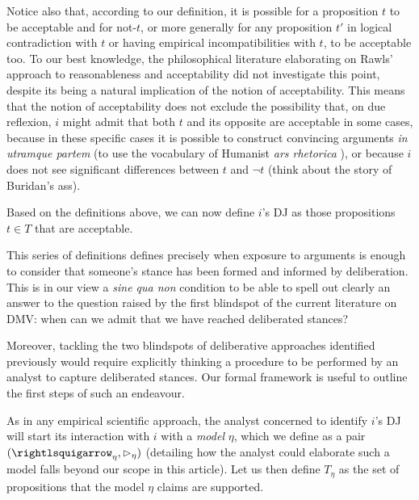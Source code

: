 \documentclass[version=3.21, pagesize, twoside=off, bibliography=totoc, DIV=calc, fontsize=12pt, a4paper, french, english]{scrartcl}
\begin{document}
Notice also that, according to our definition, it is possible for a proposition $t$ to be acceptable and for not-$t$, or more generally for any proposition $t'$ in logical contradiction with $t$ or having empirical incompatibilities with $t$, to be acceptable too.
To our best knowledge, the philosophical literature elaborating on Rawls' approach to reasonableness and acceptability did not investigate this point, despite its being a natural implication of the notion of acceptability. 
This means that the notion of acceptability does not exclude the possibility that, on due reflexion, $i$ might admit that both $t$ and its opposite are acceptable in some cases, because in these specific cases it is possible to construct convincing arguments \emph{in utramque partem} (to use the vocabulary of Humanist \emph{ars rhetorica} \citep{skinner_reason_1996}), or because $i$ does not see significant differences between $t$ and $¬t$ (think about the story of Buridan’s ass).

Based on the definitions above, we can now define $i$'s \ac{DJ} as those propositions $t \in T$ that are acceptable. %

This series of definitions defines precisely when exposure to arguments is enough to consider that someone’s stance has been formed and informed by deliberation. 
This is in our view a \emph{sine qua non} condition to be able to spell out clearly an answer to the question raised by the first blindspot of the current literature on DMV: when can we admit that we have reached deliberated stances?

Moreover, tackling the two blindspots of deliberative approaches identified previously would require explicitly thinking a procedure to be performed by an analyst to capture deliberated stances. Our formal framework is useful to outline the first steps of such an endeavour.

As in any empirical scientific approach, the analyst concerned to identify $i$'s \ac{DJ} will start its interaction with $i$ with a \emph{model} $\eta$, which we define as a pair $(\mleadsto, \mbeats)$ (detailing how the analyst could elaborate such a model falls beyond our scope in this article). 
Let us then define $T_\eta$ as the set of propositions that the model $\eta$ claims are supported.%
\end{document}
